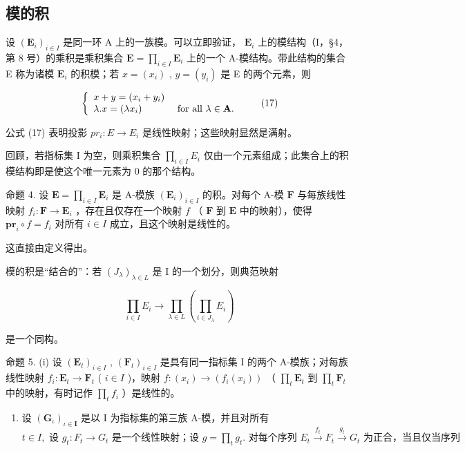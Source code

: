 \subsection{模的积}

设 \((\mathbf{E}_i)_{i\in I}\) 是同一环 A 上的一族模。可以立即验证， \(\mathbf{E}_i\) 上的模结构（I，§4，第 8 号）的乘积是乘积集合 \(\mathbf{E} = \prod_{i\in I}\mathbf{E}_i\) 上的一个 A-模结构。带此结构的集合 E 称为诸模 \(\mathbf{E}_i\) 的积模；若 \(x = (x_i)\) , \(y = (y_i)\) 是 E 的两个元素，则

\[
\left\{ \begin{array}{l l} x + y = (x _ {i} + y _ {i}) \\ \lambda . x = (\lambda x _ {i}) & \text { for   all } \lambda \in \mathbf {A}. \end{array} \right.\tag{17}
\]

公式 (17) 表明投影 \(pr_{i}:E\to E_{i}\) 是线性映射；这些映射显然是满射。

回顾，若指标集 I 为空，则乘积集合 \(\prod_{i\in I}E_{i}\) 仅由一个元素组成；此集合上的积模结构即是使这个唯一元素为 0 的那个结构。

命题 4. 设 \(\mathbf{E} = \prod_{i\in I}\mathbf{E}_i\) 是 A-模族 \((\mathbf{E}_i)_{i\in I}\) 的积。对每个 A-模 \(\mathbf{F}\) 与每族线性映射 \(f_i:\mathbf{F}\to \mathbf{E}_i\) ，存在且仅存在一个映射 \(f\) （ \(\mathbf{F}\) 到 \(\mathbf{E}\) 中的映射），使得 \(\mathbf{pr}_i\circ f = f_i\) 对所有 \(i\in I\) 成立，且这个映射是线性的。

这直接由定义得出。

模的积是“结合的”：若 \((J_{\lambda})_{\lambda \in L}\) 是 I 的一个划分，则典范映射

\[
\prod_ {i \in I} E _ {i} \rightarrow \prod_ {\lambda \in L} \left(\prod_ {i \in J _ {\lambda}} E _ {i}\right)
\]

是一个同构。

命题 5. (i) 设 \((\mathbf{E}_t)_{i \in I}\) , \((\mathbf{F}_t)_{i \in I}\) 是具有同一指标集 I 的两个 A-模族；对每族线性映射 \(f_i: \mathbf{E}_t \to \mathbf{F}_t\) ( \(i \in I\) )，映射 \(f: (x_i) \to (f_i(x_i))\) （ \(\prod_t \mathbf{E}_t\) 到 \(\prod_t \mathbf{F}_t\) 中的映射，有时记作 \(\prod_t f_i\) ）是线性的。

\begin{enumerate}
\def\labelenumi{(\roman{enumi})}
\setcounter{enumi}{1}
\tightlist
\item
  设 \((\mathbf{G}_{\iota})_{\iota \in \mathbf{I}}\) 是以 I 为指标集的第三族 A-模，并且对所有 \(t \in I, \text{ 设 } g_t: F_t \to G_t \text{ 是一个线性映射；设 } g = \prod_t g_t. \text{ 对每个序列 } E_t \xrightarrow{f_t} F_t \xrightarrow{g_t} G_t \text{ 为正合，当且仅当序列}\)
\end{enumerate}

